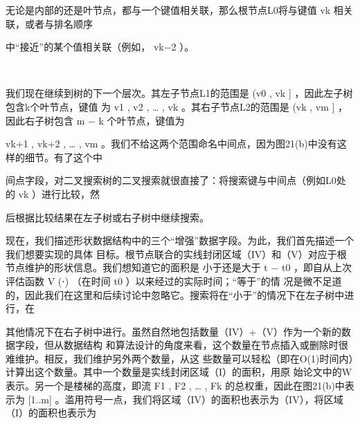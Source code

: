 无论是内部的还是叶节点，都与一个键值相关联，那么根节点L0将与键值 vk 相关联，或者与排名顺序
      ​




中“接近”的某个值相关联（例如， vk−2 ）。
                                                                                                          ​




                                              ​




我们现在继续到树的下一个层次。其左子节点L1的范围是 (v0 , vk ] ，因此左子树包含k个叶节点，键值
为 v1 , v2 , … , vk 。其右子节点L2的范围是 (vk , vm ] ，因此右子树包含 m − k 个叶节点，键值为
                                                                              ​               ​




 vk+1 , vk+2 , … , vm 。我们不给这两个范围命名中间点，因为图21(b)中没有这样的细节。有了这个中
          ​                   ​                   ​       ​




间点字段，对二叉搜索树的二叉搜索就很直接了：将搜索键与中间点（例如L0处的 vk ）进行比较，然
              ​                           ​




后根据比较结果在左子树或右子树中继续搜索。
                                                                                                                  ​




现在，我们描述形状数据结构中的三个“增强”数据字段。为此，我们首先描述一个我们想要实现的具体
目标。根节点联合的实线封闭区域（IV）和（V）对应于根节点维护的形状信息。我们想知道它的面积是
小于还是大于 t − t0 ，即自从上次评估函数 V (⋅) （在时间 t0 ）以来经过的实际时间；“等于”的情
况是微不足道的，因此我们在这里和后续讨论中忽略它。搜索将在“小于”的情况下在左子树中进行，在
                                      ​                                               ​




其他情况下在右子树中进行。虽然自然地包括数量（IV）+（V）作为一个新的数据字段，但从数据结构
和算法设计的角度来看，这个数量在节点插入或删除时很难维护。相反，我们维护另外两个数量，从这
些数量可以轻松（即在O(1)时间内）计算出这个数量。其中一个数量是实线封闭区域（I）的面积，用原
始论文中的W表示。另一个是楼梯的高度，即流 F1 , F2 , … , Fk 的总权重，因此在图21(b)中表示为
 [1..m] 。滥用符号一点，我们将区域（IV）的面积也表示为（IV），将区域（I）的面积也表示为
                                                      ​       ​                           ​




